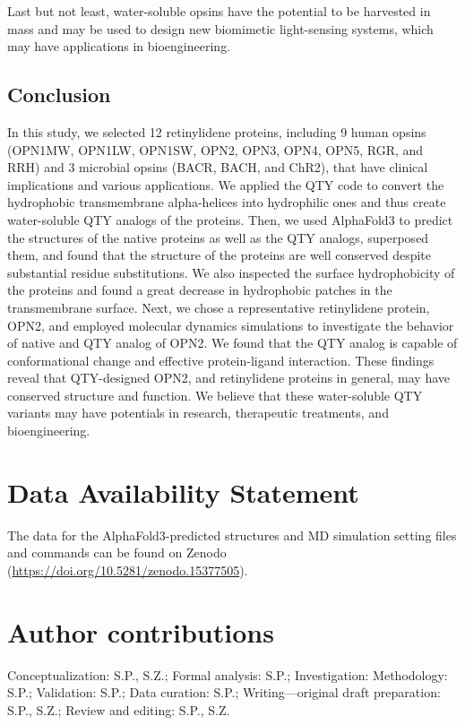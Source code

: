 \documentclass[fleqn, 10pt, lineno]{manuscript}
\begin{document}
Last but not least, water-soluble opsins have the potential to be harvested in mass and may be used to design new biomimetic light-sensing systems, which may have applications in bioengineering. 

\subsection*{Conclusion}

In this study, we selected 12 retinylidene proteins, including 9 human opsins (OPN1MW, OPN1LW, OPN1SW, OPN2, OPN3, OPN4, OPN5, RGR, and RRH) and 3 microbial opsins (BACR, BACH, and ChR2), that have clinical implications and various applications. We applied the QTY code to convert the hydrophobic transmembrane alpha-helices into hydrophilic ones and thus create water-soluble QTY analogs of the proteins. Then, we used AlphaFold3 to predict the structures of the native proteins as well as the QTY analogs, superposed them, and found that the structure of the proteins are well conserved despite substantial residue substitutions. We also inspected the surface hydrophobicity of the proteins and found a great decrease in hydrophobic patches in the transmembrane surface. Next, we chose a representative retinylidene protein, OPN2, and employed molecular dynamics simulations to investigate the behavior of native and QTY analog of OPN2. We found that the QTY analog is capable of conformational change and effective protein-ligand interaction. These findings reveal that QTY-designed OPN2, and retinylidene proteins in general, may have conserved structure and function. We believe that these water-soluble QTY variants may have potentials in research, therapeutic treatments, and bioengineering. 


\section*{Data Availability Statement} 

The data for the AlphaFold3-predicted structures and MD simulation setting files and commands can be found on Zenodo (\url{https://doi.org/10.5281/zenodo.15377505}). 

\section*{Author contributions}

Conceptualization: S.P., S.Z.; Formal analysis: S.P.; Investigation: Methodology: S.P.; Validation: S.P.; Data curation: S.P.; Writing—original draft preparation: S.P., S.Z.; Review and editing: S.P., S.Z. 
\end{document}
